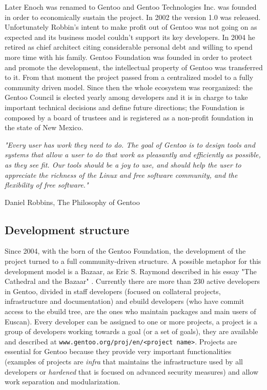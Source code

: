 Later Enoch was renamed to Gentoo and Gentoo Technologies Inc. was founded in order to economically sustain the project. In 2002 the version 1.0 was released.
Unfortunately Robbin's intent to make profit out of Gentoo was not going on as expected and its business model couldn't support its key developers.
In 2004 he retired as chief architect citing considerable personal debt and willing to spend more time with his family. Gentoo Foundation was founded in order to protect and promote the development, the intellectual property of Gentoo was transferred to it. From that moment the project passed from a centralized model to a fully community driven model.
Since then the whole ecosystem was reorganized: the Gentoo Council is elected yearly among developers and it is in charge to take important technical decisions and define future directions; the Foundation is composed by a board of trustees and is registered as a non-profit foundation in the state of New Mexico.

\vspace{0.8cm}
\emph{"Every user has work they need to do. The goal of Gentoo is to design tools and systems that allow a user to do that work as pleasantly and efficiently as possible, as they see fit. Our tools should be a joy to use, and should help the user to appreciate the richness of the Linux and free software community, and the flexibility of free software."}
\vspace{0.2cm}

\hfill Daniel Robbins, The Philosophy of Gentoo \cite{gentoo_philosophy}


\subsection{Development structure}
Since 2004, with the born of the Gentoo Foundation, the development of the project turned to a full community-driven structure. A possible metaphor for this development model is a Bazaar, as Eric S. Raymond described in his essay "The Cathedral and the Bazaar" \cite{cathedral_bazaar}.
Currently there are more than 230 active developers in Gentoo, divided in staff developers (focused on collateral projects, infrastructure and documentation) and ebuild developers (who have commit access to the ebuild tree, are the ones who maintain packages and main users of Euscan).
Every developer can be assigned to one or more projects, a project is a group of developers working towards a goal (or a set of goals), they are available and described at \texttt{www.gentoo.org/proj/en/<project name>}. Projects are essential for Gentoo because they provide very important functionalities (examples of projects are \emph{infra} that maintains the infrastructure used by all developers or \emph{hardened} that is focused on advanced security measures) and allow work separation and modularization.

